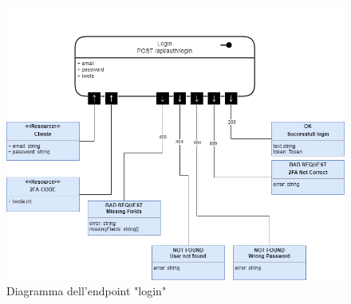 \documentclass{report}
\begin{document}
\begin{figure}[H]
	\centering\includegraphics[width=1\textwidth]{images/microservizio-autenticazione/diagrams/diagramma_login.drawio.png}
	\caption{Diagramma dell'endpoint "login"}
\end{figure}
\end{document}
